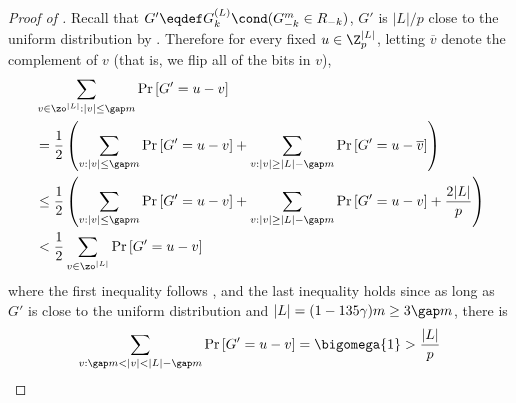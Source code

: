 	\begin{proof}[Proof of ]
		Recall that $G'\eqdef  G_k^{(L)}\cond (G_{-k}^m \in R_{-k})$,
		$G'$ is $|L|/p$ close to the uniform distribution by . 
		Therefore for every fixed $u\in \Z_p^{|L|}$, letting $\overline{v}$ denote the complement of $v$ {\color{black}(that is, we flip all of the bits in $v$)},
		\begin{align*}
			& \sum_{v\in\zo^{|L|}: |v|\le \gap m} \Pr\left[ G'=u-v \right]\\  
			&= \frac{1}{2}\left(\sum_{v:|v|\le \gap m}\Pr\left[G'=u-v\right]+\sum_{v:|v|\ge |L|-\gap m}\Pr\left[G'=u-\overline{v}\right]\right)\\
	 		&\le  \frac{1}{2}\left(\sum_{v:|v|\le \gap m}\Pr\left[G'=u-v\right]+\sum_{v:|v|\ge |L|-\gap m}\Pr\left[G'={u-v} \right]+\frac{2|L|}{p}\right)\\
	 		&<  \frac{1}{2}\sum_{v\in \zo^{|L|}}\Pr\left[G'={u-v} \right]
		\end{align*}
		where the first inequality follows ,
		and the last inequality holds since as long as $G'$ is close to the uniform distribution and $|L|=(1-135\gamma)m\ge 3\gap m$, there is 
		\[\sum_{v:\gap m<|v|<|L|-\gap m}\Pr\left[G'={u-v} \right] = \bigomega{1}> \frac{|L|}{p}\]


\end{proof}
